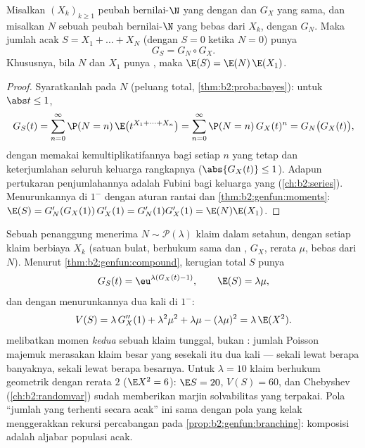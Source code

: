 \begin{theorem}\label{thm:b2:genfun:compound}
Misalkan $(X_k)_{k\geq1}$ peubah bernilai-$\N$ yang  dengan
 dan  $G_X$ yang sama, dan misalkan $N$ sebuah
peubah bernilai-$\N$ yang bebas dari $X_k$, dengan  $G_N$. Maka jumlah acak $S = X_1 + \dots + X_N$ (dengan
$S = 0$ ketika $N = 0$) punya 
\[
G_S = G_N \circ G_X .
\]
Khususnya, bila $N$ dan $X_1$ punya , maka $\E(S) =
\E(N)\,\E(X_1)$.
\end{theorem}

\begin{proof}
Syaratkanlah pada $N$ (peluang total,
\cref{thm:b2:proba:bayes}): untuk $\abs t \leq 1$,
\[
G_S(t) = \sum_{n=0}^\infty \P(N = n)\,
\E\bigl(t^{X_1 + \dots + X_n}\bigr)
= \sum_{n=0}^\infty \P(N = n)\,G_X(t)^n
= G_N\bigl(G_X(t)\bigr),
\]
dengan memakai kemultiplikatifannya bagi setiap $n$ yang tetap dan keterjumlahan
seluruh keluarga rangkapnya ($\abs{G_X(t)} \leq 1$). Adapun pertukaran
penjumlahannya adalah Fubini bagi keluarga yang 
(\cref{ch:b2:series}). Menurunkannya di $1^-$ dengan aturan rantai
dan \cref{thm:b2:genfun:moments}: $\E(S) = G_N'(G_X(1))\,G_X'(1)
= G_N'(1)G_X'(1) = \E(N)\E(X_1)$.
\end{proof}

\begin{example}\label{ex:b2:genfun:compoundpoisson}
Sebuah penanggung menerima $N \sim \mathcal P(\lambda)$ klaim dalam
setahun, dengan setiap klaim berbiaya $X_k$ (satuan bulat, berhukum sama dan
,  $G_X$, rerata $\mu$, bebas dari $N$). Menurut
\cref{thm:b2:genfun:compound}, kerugian total $S$ punya
\[
G_S(t) = \eu^{\lambda(G_X(t) - 1)},
\qquad
\E(S) = \lambda\mu ,
\]
dan dengan menurunkannya dua kali di $1^-$:
\[
V(S) = \lambda\,G_X''(1) + \lambda^2\mu^2 + \lambda\mu -
(\lambda\mu)^2 = \lambda\,\E(X^2) .
\]
 melibatkan momen \emph{kedua} sebuah klaim tunggal,
bukan : jumlah Poisson majemuk merasakan
klaim besar yang sesekali itu dua kali --- sekali lewat berapa banyaknya, sekali
lewat berapa besarnya. Untuk $\lambda = 10$ klaim berhukum geometrik
dengan rerata $2$ ($\E X^2 = 6$): $\E S = 20$, $V(S) = 60$, dan
Chebyshev (\cref{ch:b2:randomvar}) sudah memberikan
marjin solvabilitas yang terpakai. Pola ``jumlah yang terhenti secara acak'' ini
sama dengan pola yang kelak menggerakkan rekursi percabangan pada
\cref{prop:b2:genfun:branching}: komposisi  adalah aljabar populasi acak.
\end{example}

